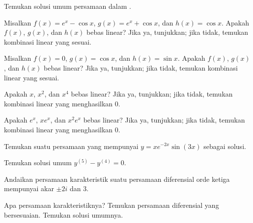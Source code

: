 \begin{exercise}
Temukan solusi umum persamaan dalam .
\end{exercise}

\begin{exercise}
Misalkan $f(x) = e^x - \cos x$, $g(x) = e^x + \cos x$, dan $h(x) = \cos x$. Apakah $f(x)$, $g(x)$, dan $h(x)$ bebas linear? Jika ya, tunjukkan; jika tidak, temukan kombinasi linear yang sesuai.
\end{exercise}

\begin{exercise}
Misalkan $f(x) = 0$, $g(x) = \cos x$, dan $h(x) = \sin x$. Apakah $f(x)$, $g(x)$, dan $h(x)$ bebas linear? Jika ya, tunjukkan; jika tidak, temukan kombinasi linear yang sesuai.
\end{exercise}

\begin{exercise}
Apakah $x$, $x^2$, dan $x^4$ bebas linear? Jika ya, tunjukkan; jika tidak, temukan kombinasi linear yang menghasilkan $0$.
\end{exercise}

\begin{exercise}
Apakah $e^x$, $xe^x$, dan $x^2e^x$ bebas linear? Jika ya, tunjukkan; jika tidak, temukan kombinasi linear yang menghasilkan $0$.
\end{exercise}

\begin{exercise}
Temukan suatu persamaan yang mempunyai $y=xe^{-2x}\sin(3x)$ sebagai solusi.
\end{exercise}

\setcounter{exercise}{100}

\begin{exercise}
Temukan solusi umum $y^{(5)}-y^{(4)}=0$.
\end{exercise}

\begin{exercise}
\pagebreak[2]
Andaikan persamaan karakteristik suatu persamaan diferensial orde ketiga mempunyai akar $\pm 2i$ dan 3.
\begin{tasks}
\task Apa persamaan karakteristiknya?
\task Temukan persamaan diferensial yang bersesuaian.
\task Temukan solusi umumnya.
\end{tasks}
\end{exercise}

